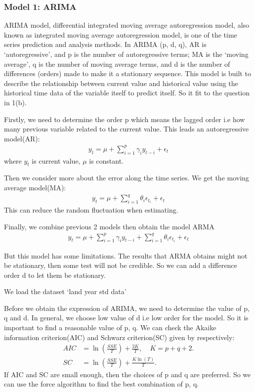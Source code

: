 \documentclass{apmcmthesis}
\begin{document}
  \subsubsection{Model 1: ARIMA}
  
  ARIMA model, differential integrated moving average autoregression model, also known as integrated moving average autoregression model, 
  is one of the time series prediction and analysis methods.
  In ARIMA (p, d, q), AR is `autoregressive', and p is the number of autoregressive terms; 
  MA is the `moving average', q is the number of moving average terms, and d is the number of differences (orders) made to make it a stationary sequence.
  This model is built to describe the relationship between current value and historical value using the historical time data of the variable itself to predict itself.
  So it fit to the question in 1(b).
  
  Firstly, we need to determine the order p which means the lagged order i.e how many previous variable related to the current value.
  This leads an autoregressive model(AR):
  \begin{align*}
    y_t = \mu + \sum^p_{i=1} \gamma_i y_{t-i} + \epsilon_t
  \end{align*}
  where $y_t$ is current value, $\mu$ is constant.
  
  Then we consider more about the error along the time series. 
  We get the moving average model(MA):
  \begin{align*}
    y_t = \mu + \sum^q_{i=1} \theta_i \epsilon_{t_i} + \epsilon_t
  \end{align*}
  This can reduce the random fluctuation when estimating. 
  
  Finally, we combine previous 2 models then obtain the model ARMA
  \begin{align*}
    y_t = \mu + \sum^p_{i=1} \gamma_i y_{t-i}  + \sum^q_{i=1} \theta_i \epsilon_{t_i} + \epsilon_t
  \end{align*}
  
  But this model has some limitations.
  The results that ARMA obtains might not be stationary, then some test will not be credible. 
  So we can add a difference order d to let them be stationary. 
  
  We load the dataset `land year std data'
  
  Before we obtain the expression of ARIMA, we need to determine the value of p, q and d.
  In general, we choose low value of d i.e low order for the model. 
  So it is important to find a reasonable value of p, q.
  We can check the Akaike information criterion(AIC) and Schwarz criterion(SC) 
  given by respectively:
  \begin{align*}
    AIC&=\ln(\frac{SSE}{T})+\frac{2K}{T},\;\;\;\;K=p+q+2.\\
    SC&=\ln(\frac{SSE}{T})+\frac{K\ln(T)}{T}.
  \end{align*}
  If AIC and SC are small enough, then the choices of p and q are preferred.
  So we can use the force algorithm to find the best combination of p, q.
  
\end{document}
